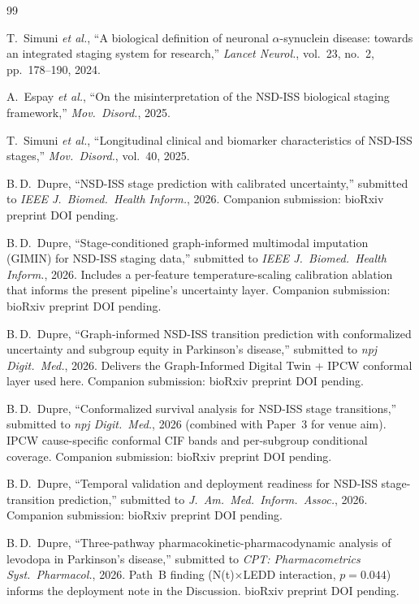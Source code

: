 \documentclass[11pt,letterpaper]{article}
\begin{document}

\begin{thebibliography}{99}

T.~Simuni \textit{et al.}, ``A biological definition of neuronal $\alpha$-synuclein disease: towards an integrated staging system for research,'' \textit{Lancet Neurol.}, vol.~23, no.~2, pp.~178--190, 2024.

A.~Espay \textit{et al.}, ``On the misinterpretation of the NSD-ISS biological staging framework,'' \textit{Mov.\ Disord.}, 2025.

T.~Simuni \textit{et al.}, ``Longitudinal clinical and biomarker characteristics of NSD-ISS stages,'' \textit{Mov.\ Disord.}, vol.~40, 2025.

B.\,D.~Dupre, ``NSD-ISS stage prediction with calibrated uncertainty,'' submitted to \textit{IEEE J.\ Biomed.\ Health Inform.}, 2026. Companion submission: bioRxiv preprint DOI pending.

B.\,D.~Dupre, ``Stage-conditioned graph-informed multimodal imputation (GIMIN) for NSD-ISS staging data,'' submitted to \textit{IEEE J.\ Biomed.\ Health Inform.}, 2026. Includes a per-feature temperature-scaling calibration ablation that informs the present pipeline's uncertainty layer. Companion submission: bioRxiv preprint DOI pending.

B.\,D.~Dupre, ``Graph-informed NSD-ISS transition prediction with conformalized uncertainty and subgroup equity in Parkinson's disease,'' submitted to \textit{npj Digit.\ Med.}, 2026. Delivers the Graph-Informed Digital Twin + IPCW conformal layer used here. Companion submission: bioRxiv preprint DOI pending.

B.\,D.~Dupre, ``Conformalized survival analysis for NSD-ISS stage transitions,'' submitted to \textit{npj Digit.\ Med.}, 2026 (combined with Paper~3 for venue aim). IPCW cause-specific conformal CIF bands and per-subgroup conditional coverage. Companion submission: bioRxiv preprint DOI pending.

B.\,D.~Dupre, ``Temporal validation and deployment readiness for NSD-ISS stage-transition prediction,'' submitted to \textit{J.\ Am.\ Med.\ Inform.\ Assoc.}, 2026. Companion submission: bioRxiv preprint DOI pending.

B.\,D.~Dupre, ``Three-pathway pharmacokinetic-pharmacodynamic analysis of levodopa in Parkinson's disease,'' submitted to \textit{CPT: Pharmacometrics Syst.\ Pharmacol.}, 2026. Path~B finding (N(t)$\times$LEDD interaction, $p=0.044$) informs the deployment note in the Discussion. bioRxiv preprint DOI pending.


\end{thebibliography}
\end{document}
